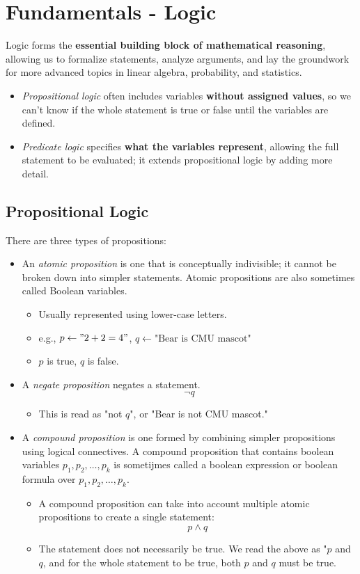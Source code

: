 \documentclass[10pt]{article}
\begin{document}
\section*{Fundamentals - Logic}
Logic forms the \textbf{essential building block of mathematical reasoning}, allowing us to formalize statements, analyze arguments, and lay the groundwork for more advanced topics in linear algebra, probability, and statistics.
\begin{itemize}
	\item \textit{Propositional logic} often includes variables \textbf{without assigned values}, so we can't know if the whole statement is true or false until the variables are defined.
	\item \textit{Predicate logic} specifies \textbf{what the variables represent}, allowing the full statement to be evaluated; it extends propositional logic by adding more detail.
\end{itemize}

\subsection*{Propositional Logic}
There are three types of propositions:
\begin{itemize}
	\item An \textit{atomic proposition} is one that is conceptually indivisible; it cannot be broken down into simpler statements.  Atomic propositions are also sometimes called Boolean variables.
	\begin{itemize}
	    \item Usually represented using lower-case letters.
	    \item e.g., $p \leftarrow "2 + 2 = 4"$, $q \leftarrow \text{"Bear is CMU mascot"}$
	    \item $p$ is true, $q$ is false.
    \end{itemize}
    \item A \textit{negate proposition} negates a statement.
    \[\neg q\]
    \begin{itemize}
	    \item This is read as "not $q$", or "Bear is not CMU mascot." 
    \end{itemize}
	\item A \textit{compound proposition} is one formed by combining simpler propositions using logical connectives.  A compound proposition that contains boolean variables $p_1, p_2, \dots, p_k$ is sometijmes called a boolean expression or boolean formula over $p_1, p_2, \dots, p_k$.
	\begin{itemize}
	    \item A compound proposition can take into account multiple atomic propositions to create a single statement:
	    \[p \land q\]
        \item The statement does not necessarily be true.  We read the above as "$p$ and $q$, and for the whole statement to be true, both $p$ and $q$ must be true.
    \end{itemize}
\end{itemize}
\end{document}
